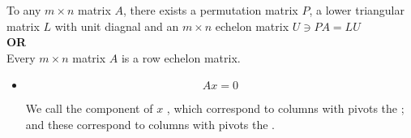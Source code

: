 \begin{theorem}
    To any $m \times n$ matrix $A$, there exists a permutation matrix $P$, a lower triangular matrix $L$ with unit diagnal and an $m \times n$ echelon matrix $U \ni PA = LU$ \\
    \textbf{OR} \\
    Every $m \times n$ matrix $A$ is  a row echelon matrix.
\end{theorem}

\newpage

\begin{itemize}
    \item {}
    
    \[
    Ax = 0
    \]
    
    We call the component of $x$ , which correspond to columns with pivots the ; and these correspond to columns with pivots the .
    

\end{itemize}
